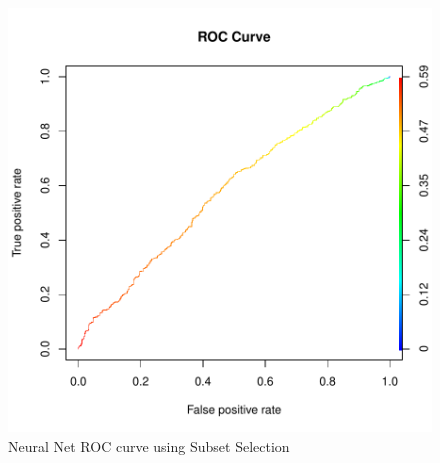 \documentclass{article}
\begin{document}
\begin{figure}
\begin{center}
\begin{Schunk}
\end{Schunk}
\includegraphics{DirectMailPrediction-022}
\end{center}
\caption{Neural Net ROC curve using Subset Selection}
\label{nn-roc-a}
\end{figure}
\end{document}
